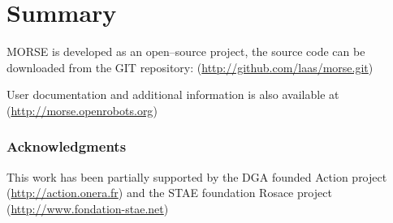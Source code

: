 \documentclass{llncs}
\begin{document}
\section{Summary}
\label{section:discussion}


MORSE is developed as an open--source project, the source code can be
downloaded from the GIT repository:
(\url{http://github.com/laas/morse.git})

User documentation and additional information is also available at
(\url{http://morse.openrobots.org})


\subsubsection*{Acknowledgments}
This work has been partially supported by the DGA founded Action project
(\url{http://action.onera.fr}) and the STAE foundation Rosace project\\
(\url{http://www.fondation-stae.net})



\end{document}
